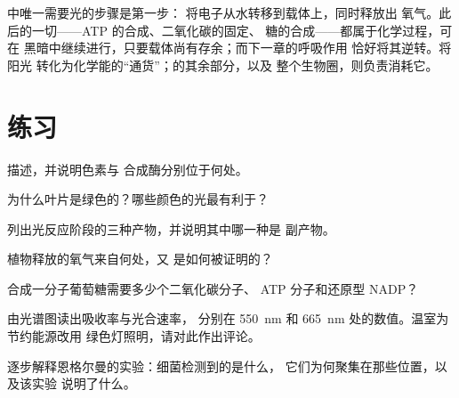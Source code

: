 \begin{remark}[先光后化]\label{rem:g12:photosynthesis:light}
中唯一需要光的步骤是第一步：
将电子从水转移到载体上，同时释放出
氧气。此后的一切——ATP 的合成、二氧化碳的固定、
糖的合成——都属于化学过程，可在
黑暗中继续进行，只要载体尚有存余；而下一章的呼吸作用
恰好将其逆转。将阳光
转化为化学能的“通货”；的其余部分，以及
整个生物圈，则负责消耗它。
\end{remark}

\section{练习}

\begin{exercise}[$\star$]\label{exo:g12:photosynthesis:1}
描述，并说明色素与
合成酶分别位于何处。
\end{exercise}

\begin{exercise}[$\star$]\label{exo:g12:photosynthesis:2}
为什么叶片是绿色的？哪些颜色的光最有利于？
\end{exercise}

\begin{exercise}[$\star$]\label{exo:g12:photosynthesis:3}
列出光反应阶段的三种产物，并说明其中哪一种是
副产物。
\end{exercise}

\begin{exercise}[$\star$]\label{exo:g12:photosynthesis:4}
植物释放的氧气来自何处，又
是如何被证明的？
\end{exercise}

\begin{exercise}[$\star$]\label{exo:g12:photosynthesis:5}
合成一分子葡萄糖需要多少个二氧化碳分子、
ATP 分子和还原型 NADP？
\end{exercise}

\begin{exercise}[$\star\star$]\label{exo:g12:photosynthesis:6}
由光谱图读出吸收率与光合速率，
分别在 \qty{550}{nm} 和 \qty{665}{nm} 处的数值。温室为节约能源改用
绿色灯照明，请对此作出评论。
\end{exercise}

\begin{exercise}[$\star\star$]\label{exo:g12:photosynthesis:7}
逐步解释恩格尔曼的实验：细菌检测到的是什么，
它们为何聚集在那些位置，以及该实验
说明了什么。
\end{exercise}

